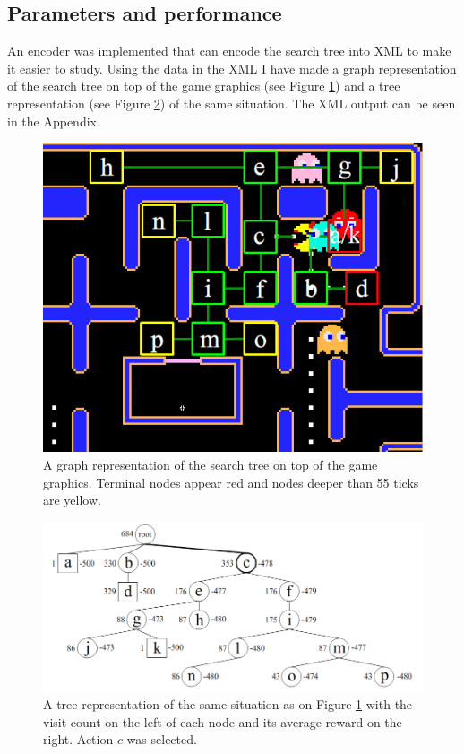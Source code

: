 \documentclass[conference]{IEEEtran}
\begin{document}
\subsection{Parameters and performance}
An encoder was implemented that can encode the search tree into XML to make it easier to study. Using the data in the XML I have made a graph representation of the search tree on top of the game graphics (see Figure \ref{fig:MCTSPac-Man}) and a tree representation (see Figure \ref{fig:MCTStree}) of the same situation. The XML output can be seen in the Appendix. 

\begin{figure}[!htb]
\centering
\includegraphics[scale=.3]{mcts-pacman.png}
\caption{A graph representation of the search tree on top of the game graphics. Terminal nodes appear red and nodes deeper than 55 ticks are yellow.}
\label{fig:MCTSPac-Man}
\end{figure}

\begin{figure}[!htb]
\centering
\includegraphics[scale=.28]{mcts-tree.png}
\caption{A tree representation of the same situation as on Figure  \ref{fig:MCTSPac-Man} with the visit count on the left of each node and its average reward on the right. Action $c$ was selected.}
\label{fig:MCTStree}
\end{figure}
\end{document}
